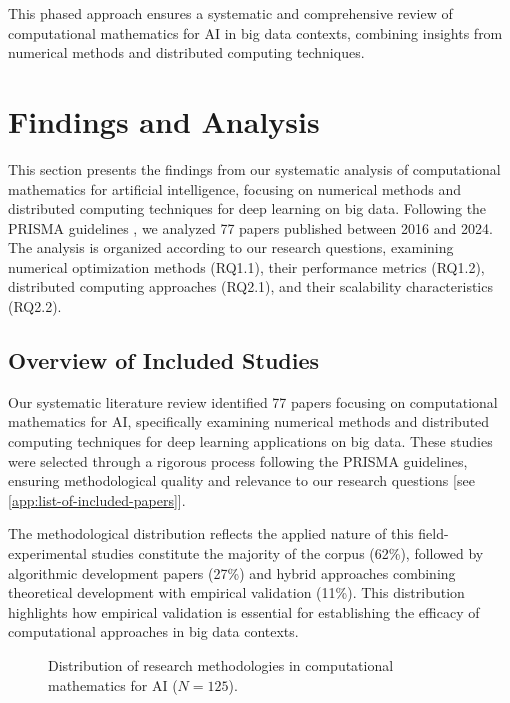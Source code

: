\documentclass[acmsmall]{acmart}
\begin{document}
This phased approach ensures a systematic and comprehensive review of computational mathematics for AI in big data contexts, combining insights from numerical methods and distributed computing techniques.

\section{Findings and Analysis}\label{sec:findings-and-analysis}
This section presents the findings from our systematic analysis of computational mathematics for artificial intelligence, focusing on numerical methods and distributed computing techniques for deep learning on big data. Following the PRISMA guidelines \citep{moher2009preferred}, we analyzed 77 papers published between 2016 and 2024. The analysis is organized according to our research questions, examining numerical optimization methods (RQ1.1), their performance metrics (RQ1.2), distributed computing approaches (RQ2.1), and their scalability characteristics (RQ2.2).


\subsection{Overview of Included Studies}\label{subsec:overview-of-included-studies}
Our systematic literature review identified 77 papers focusing on computational mathematics for AI, specifically examining numerical methods and distributed computing techniques for deep learning applications on big data. These studies were selected through a rigorous process following the PRISMA guidelines, ensuring methodological quality and relevance to our research questions [see \cref{app:list-of-included-papers}].

The methodological distribution reflects the applied nature of this field-experimental studies constitute the majority of the corpus (62\%), followed by algorithmic development papers (27\%) and hybrid approaches combining theoretical development with empirical validation (11\%). This distribution highlights how empirical validation is essential for establishing the efficacy of computational approaches in big data contexts.

\begin{figure}[ht]
    \centering
    \caption{Distribution of research methodologies in computational mathematics for AI ($N=125$).}
    \label{fig:methodology_distribution}
\end{figure}
\end{document}
